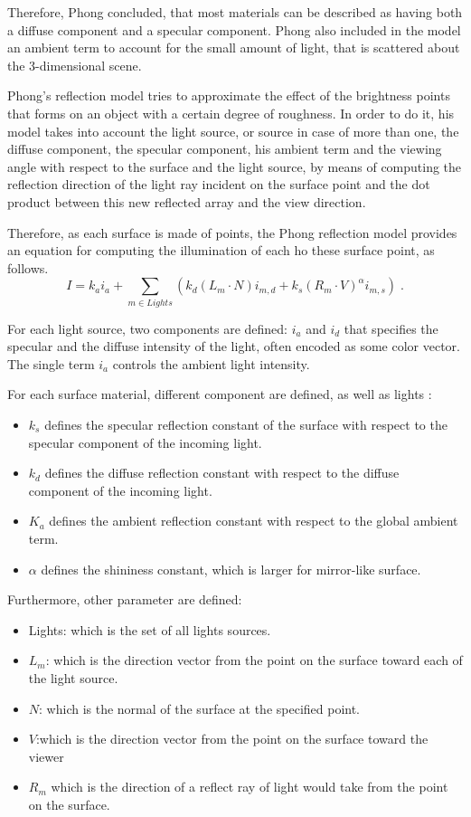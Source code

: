 \documentclass[12pt,a4paper]{extarticle}
\newcommand{\linespace}{\vspace{0pt}}
\begin{document}
Therefore, Phong concluded, that most materials can be described as having both a diffuse component and a specular component. Phong also included in the model an ambient term to account for the small amount of light, that is scattered about the 3-dimensional scene.
\linespace

Phong's reflection model tries to approximate the effect of the brightness points that forms on an object with a certain degree of roughness. In order to do it, his model takes into account the light source, or source in case of more than one, the diffuse component, the specular component, his ambient term and the viewing angle with respect to the surface and the light source, by means of computing the reflection direction of the light ray incident on the surface point and the dot product between this new reflected array and the view direction.

Therefore, as each surface is made of points, the Phong reflection model provides an equation for computing the illumination of each ho these surface point, as follows.
\[
I = k_{a} i_{a} + \sum_{m \in Lights} (k_{d}(L_{m} \cdot N)i_{m,d} +k_{s}(R_{m} \cdot V)^{\alpha}i_{m,s}) \;.
\]

For each light source, two components are defined: $i_{a}$ and $i_{d}$ that specifies the specular and the diffuse intensity of the light, often encoded as some color vector. The single term $i_{a}$ controls the ambient light intensity.

For each surface material, different component  are defined, as well as lights :
\begin{itemize}
\item $k_{s}$ defines the specular reflection constant of the surface with respect to the specular component of the incoming light.

\item $k_{d}$ defines the diffuse reflection constant with respect to the diffuse component of the incoming light.

\item $K_{a}$ defines the ambient reflection constant with respect to the global ambient term.
\item$\alpha$ defines the shininess constant, which is larger for mirror-like surface.
\end{itemize}

Furthermore, other parameter are defined:
\begin{itemize}
\item Lights: which is the set of all lights sources.
\item $L_{m}$: which is the direction vector from the point on the surface toward each of the light source.
\item $N$: which is the normal of the surface at the specified point.
\item $V$:which is the direction vector from the point on the surface toward the viewer
\item $R_{m}$ which is the direction of a reflect ray of light would take from the point on the surface.
\end{itemize}
\end{document}
